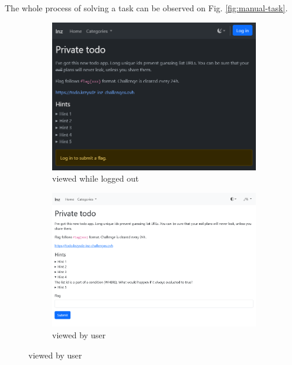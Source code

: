 The whole process of solving a task can be observed on Fig. \ref{fig:manual-task}.

\begin{figure}
    \centering
    \begin{subfigure}{0.48\textwidth}
        \includegraphics[width=\textwidth]{img/manual-task-anon.png}
        \caption{viewed while logged out}
        \label{fig:manual-task-anon}
    \end{subfigure}
    \hfill
    \begin{subfigure}{0.48\textwidth}
        \includegraphics[width=\textwidth]{img/manual-task-user.png}
        \caption{viewed by user}
        \label{fig:manual-task-user}
    \end{subfigure}


\end{figure}
